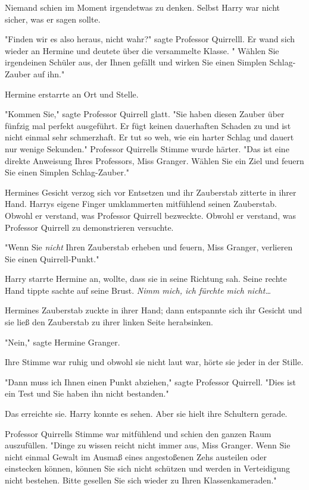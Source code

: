 {Niemand schien im Moment irgendetwas zu denken. Selbst Harry war nicht sicher, was er sagen sollte.

"Finden wir es also heraus, nicht wahr?" sagte Professor Quirrelll. Er wand sich wieder an Hermine und deutete über die versammelte Klasse. " Wählen Sie irgendeinen Schüler aus, der Ihnen gefällt und wirken Sie einen Simplen Schlag-Zauber auf ihn."

Hermine erstarrte an Ort und Stelle.

"Kommen Sie," sagte Professor Quirrell glatt. "Sie haben diesen Zauber über fünfzig mal perfekt ausgeführt. Er fügt keinen dauerhaften Schaden zu und ist nicht einmal sehr schmerzhaft. Er tut so weh, wie ein harter Schlag und dauert nur wenige Sekunden." Professor Quirrells Stimme wurde härter. "Das ist eine direkte Anweisung Ihres Professors, Miss Granger. Wählen Sie ein Ziel und feuern Sie einen Simplen Schlag-Zauber."

Hermines Gesicht verzog sich vor Entsetzen und ihr Zauberstab zitterte in ihrer Hand. Harrys eigene Finger umklammerten mitfühlend seinen Zauberstab. Obwohl er verstand, was Professor Quirrell bezweckte. Obwohl er verstand, was Professor Quirrell zu demonstrieren versuchte.

"Wenn Sie \emph{nicht} Ihren Zauberstab erheben und feuern, Miss Granger, verlieren Sie einen Quirrell-Punkt."

Harry starrte Hermine an, wollte, dass sie in seine Richtung sah. Seine rechte Hand tippte sachte auf seine Brust. \emph{Nimm mich, ich fürchte mich nicht…}

Hermines Zauberstab zuckte in ihrer Hand; dann entspannte sich ihr Gesicht und sie ließ den Zauberstab zu ihrer linken Seite herabsinken.

"Nein," sagte Hermine Granger.

Ihre Stimme war ruhig und obwohl sie nicht laut war, hörte sie jeder in der Stille.

"Dann muss ich Ihnen einen Punkt abziehen," sagte Professor Quirrell. "Dies ist ein Test und Sie haben ihn nicht bestanden."

Das erreichte sie. Harry konnte es sehen. Aber sie hielt ihre Schultern gerade.

Professor Quirrells Stimme war mitfühlend und schien den ganzen Raum auszufüllen. "Dinge zu wissen reicht nicht immer aus, Miss Granger. Wenn Sie nicht einmal Gewalt im Ausmaß eines angestoßenen Zehs austeilen oder einstecken können, können Sie sich nicht schützen und werden in Verteidigung nicht bestehen. Bitte gesellen Sie sich wieder zu Ihren Klassenkameraden."

}
